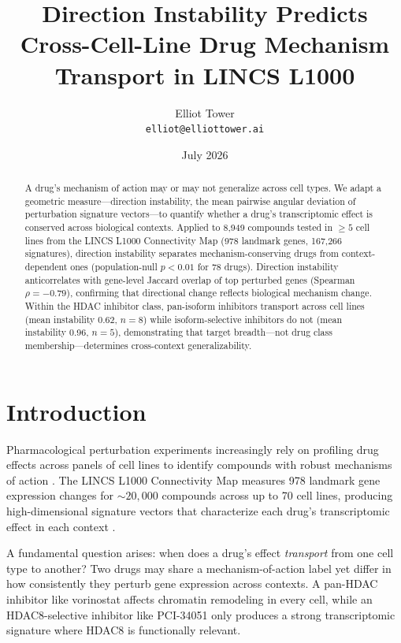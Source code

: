 \documentclass[11pt]{article}
\title{Direction Instability Predicts Cross-Cell-Line Drug Mechanism Transport in LINCS L1000}
\author{Elliot Tower\\
\texttt{elliot@elliottower.ai}}
\date{July 2026}
\begin{document}
\maketitle

\begin{abstract}
A drug's mechanism of action may or may not generalize across cell types.
We adapt a geometric measure---direction instability, the mean pairwise
angular deviation of perturbation signature vectors---to quantify whether
a drug's transcriptomic effect is conserved across biological contexts.
Applied to 8{,}949 compounds tested in $\geq5$ cell lines from the LINCS
L1000 Connectivity Map (978 landmark genes, 167{,}266 signatures), direction
instability separates mechanism-conserving drugs from context-dependent ones
(population-null $p<0.01$ for 78 drugs). Direction instability anticorrelates
with gene-level Jaccard overlap of top perturbed genes (Spearman
$\rho=-0.79$), confirming that directional change reflects biological
mechanism change. Within the HDAC inhibitor class, pan-isoform inhibitors
transport across cell lines (mean instability 0.62, $n=8$) while
isoform-selective inhibitors do not (mean instability 0.96, $n=5$),
demonstrating that target breadth---not drug class membership---determines
cross-context generalizability.
\end{abstract}

\section{Introduction}

Pharmacological perturbation experiments increasingly rely on profiling drug
effects across panels of cell lines to identify compounds with robust
mechanisms of action \citep{subramanian2017next}. The LINCS L1000 Connectivity
Map measures 978 landmark gene expression changes for ${\sim}20{,}000$
compounds across up to 70 cell lines, producing high-dimensional signature
vectors that characterize each drug's transcriptomic effect in each context
\citep{subramanian2017next}.

A fundamental question arises: when does a drug's effect \emph{transport}
from one cell type to another? Two drugs may share a mechanism-of-action
label yet differ in how consistently they perturb gene expression across
contexts. A pan-HDAC inhibitor like vorinostat affects chromatin remodeling
in every cell, while an HDAC8-selective inhibitor like PCI-34051 only
produces a strong transcriptomic signature where HDAC8 is functionally
relevant.
\end{document}

